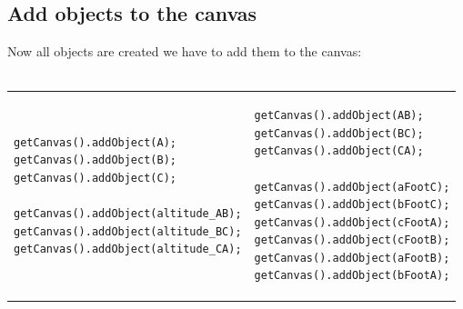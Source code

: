    \subsection*{Add objects to the canvas}
      Now all objects are created we have to add them to the canvas:\\\\
\begin{tabular}{l|l}
\begin{minipage}{6.5cm}
\begin{footnotesize}
\begin{verbatim}
getCanvas().addObject(A);
getCanvas().addObject(B);
getCanvas().addObject(C);

getCanvas().addObject(altitude_AB);
getCanvas().addObject(altitude_BC);
getCanvas().addObject(altitude_CA);
\end{verbatim}
\end{footnotesize}
\end{minipage}
&\begin{minipage}{6cm}
\begin{footnotesize}
\begin{verbatim}
getCanvas().addObject(AB);
getCanvas().addObject(BC);
getCanvas().addObject(CA);

getCanvas().addObject(aFootC);
getCanvas().addObject(bFootC);
getCanvas().addObject(cFootA);
getCanvas().addObject(cFootB);
getCanvas().addObject(aFootB);
getCanvas().addObject(bFootA);
\end{verbatim}
\end{footnotesize}
\end{minipage}
\end{tabular}
      
